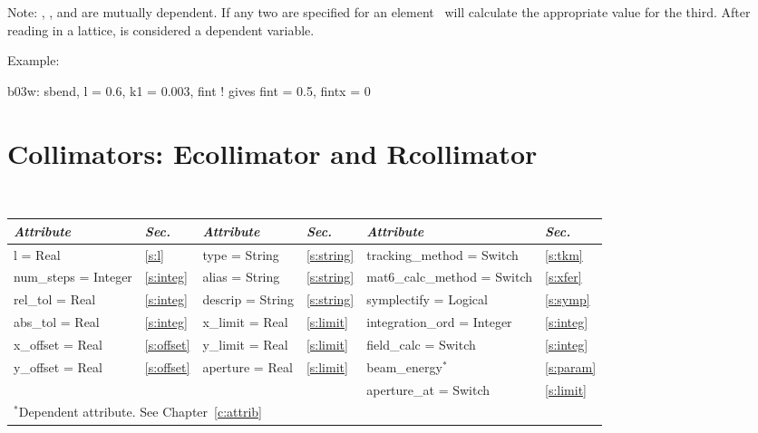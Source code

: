Note: , , and  are mutually dependent. If any two are
specified for an element \bmad\ will calculate the appropriate value
for the third.  After reading in a lattice,  is considered a
dependent variable.

Example:
\begin{example}
  b03w: sbend, l = 0.6, k1 = 0.003, fint  ! gives fint = 0.5, fintx = 0
\end{example}

\section{Collimators: Ecollimator and Rcollimator}
\label{s:col}

\begin{center}
\tt
\begin{tabular}{|l|l||l|l||l|l|} \hline
  {\sl Attribute} & {\sl Sec.}  & {\sl Attribute} & {\sl Sec.} & {\sl Attribute} & {\sl Sec.} \\ \hline
  l        = Real       & \ref{s:l}      & type = String    & \ref{s:string} & tracking\_method = Switch    & \ref{s:tkm}   \\ \hline
  num\_steps = Integer  & \ref{s:integ}  & alias = String   & \ref{s:string} & mat6\_calc\_method = Switch  & \ref{s:xfer}  \\ \hline
  rel\_tol = Real       & \ref{s:integ}  & descrip = String & \ref{s:string} & symplectify = Logical        & \ref{s:symp}  \\ \hline
  abs\_tol = Real       & \ref{s:integ}  & x\_limit = Real  & \ref{s:limit}  & integration\_ord = Integer   & \ref{s:integ} \\ \hline
  x\_offset  = Real     & \ref{s:offset} & y\_limit = Real  & \ref{s:limit}  & field\_calc = Switch         & \ref{s:integ} \\ \hline
  y\_offset  = Real     & \ref{s:offset} & aperture = Real  & \ref{s:limit}  & beam\_energy$^*$             & \ref{s:param} \\ \hline
                        &                &                  &                & aperture\_at = Switch        & \ref{s:limit} \\ \hline
  \multicolumn{6}{l}{\small $^*$Dependent attribute. See Chapter~\ref{c:attrib}} \\
\end{tabular}
\end{center}
\toffset

